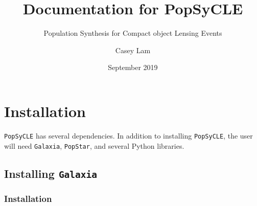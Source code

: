 \documentclass{scrartcl}
\title{Documentation for PopSyCLE}
\subtitle{Population Synthesis for Compact object Lensing Events}
\author{Casey Lam}
\date{September 2019}
\begin{document}
\maketitle

\newpage

\tableofcontents

\newpage
\section{Installation}

\texttt{PopSyCLE} has several dependencies.
In addition to installing \texttt{PopSyCLE}, the user will need \texttt{Galaxia}, \texttt{PopStar}, and several Python libraries.

\subsection{Installing \texttt{Galaxia}}

\subsubsection{Installation}
\end{document}
